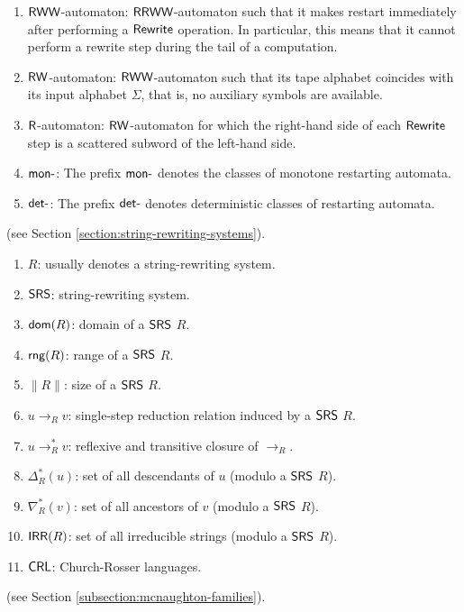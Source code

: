 \begin{enumerate}[]
\item $\textup{\sf RWW}$-automaton: $\textup{\sf RRWW}$-automaton such that it makes restart immediately after performing a $\textup{\sf Rewrite}$ operation. In particular, this means that it cannot perform a rewrite step during the tail of a computation.
\item $\textup{\sf RW}$-automaton: $\textup{\sf RWW}$-automaton such that its tape alphabet coincides with its input alphabet $\Sigma$, that is, no auxiliary symbols are available.
\item $\textup{\sf R}$-automaton: $\textup{\sf RW}$-automaton for which the right-hand side of each $\textup{\sf Rewrite}$ step is a scattered subword of the left-hand side.
\item $\textup{\sf mon-}$: The prefix $\textup{\sf mon-}$ denotes the classes of monotone restarting automata.
\item $\textup{\sf det-}$: The prefix $\textup{\sf det-}$ denotes deterministic classes of restarting automata.
\end{enumerate}

 (see Section \ref{section:string-rewriting-systems}).

\begin{enumerate}[]
\item $R$: usually denotes a string-rewriting system.
\item $\textup{\sf SRS}$: string-rewriting system.
\item $\textup{\sf dom}(R)$: domain of a $\textup{\sf SRS}$ $R$.
\item $\textup{\sf rng}(R)$: range of a $\textup{\sf SRS}$ $R$.
\item $\|R\|$: size of a $\textup{\sf SRS}$ $R$.
\item $u \to_R v$: single-step reduction relation induced by a $\textup{\sf SRS}$ $R$.
\item $u \to_R^* v$: reflexive and transitive closure of $\to_R$.
\item $\Delta_R^*(u)$: set of all descendants of $u$ (modulo a $\textup{\sf SRS}$ $R$).
\item $\nabla_R^*(v)$: set of all ancestors of $v$ (modulo a $\textup{\sf SRS}$ $R$).
\item $\textup{\sf IRR}(R)$: set of all irreducible strings (modulo a $\textup{\sf SRS}$ $R$).
\item $\textup{\sf CRL}$: Church-Rosser languages.
\end{enumerate}

 (see Section \ref{subsection:mcnaughton-families}).


